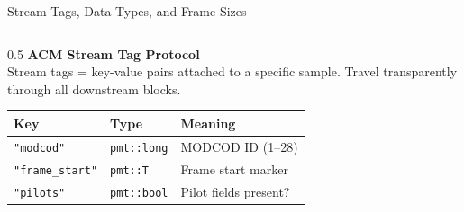 \documentclass[aspectratio=169,10pt]{beamer}
\begin{document}
\begin{frame}{Stream Tags, Data Types, and Frame Sizes}
  \begin{columns}[T]
    \begin{column}{0.5\textwidth}
      \textbf{ACM Stream Tag Protocol}\\
      \scriptsize Stream tags = key-value pairs attached to a specific sample.
      Travel transparently through all downstream blocks.
      \vspace{0.3em}

      {\scriptsize
      \begin{tabular}{lll}
        \toprule
        \textbf{Key} & \textbf{Type} & \textbf{Meaning}\\
        \midrule
        \texttt{"modcod"} & \texttt{pmt::long} & MODCOD ID (1--28)\\
        \texttt{"frame\_start"} & \texttt{pmt::T} & Frame start marker\\
        \texttt{"pilots"} & \texttt{pmt::bool} & Pilot fields present?\\
        \bottomrule
      \end{tabular}}


\end{column}
\end{columns}
\end{frame}
\end{document}
